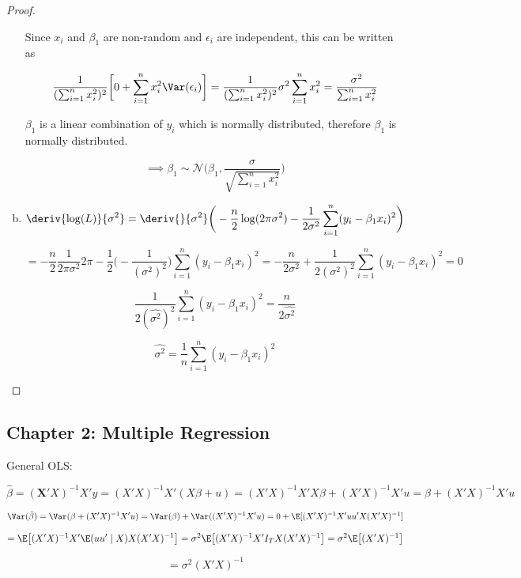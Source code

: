 \begin{proof}
\begin{enumerate}[(a)]
Since \(x_i\) and \(\beta_1\) are non-random and \(\epsilon_i\) are independent, this can be written as

\[
\frac{1}{(\sum_{i=1}^n x_i^2)^2} \bigg[0 + \sum_{i=1}^n x_i^2 \Var(\epsilon_i)  \bigg] =  \frac{1}{(\sum_{i=1}^n x_i^2)^2} \sigma^2 \sum_{i=1}^n x_i^2 = \frac{\sigma^2}{\sum_{i=1}^n x_i^2}
\]

\(\beta_1\) is a linear combination of \(y_i\) which is normally distributed, therefore \(\beta_1\) is normally distributed.

\[
\implies
\beta_1 \sim\mathcal{N}\bigg(\beta_1, \frac{\sigma}{\sqrt{\sum_{i=1}^n x_i^2}}\bigg)
\]

\item

\[
\deriv{\log(L)}{\sigma^2} = \deriv{}{\sigma^2} \bigg(  -\frac{n}{2} \log(2 \pi \sigma^2) -\frac{1}{2\sigma^2} \sum_{i=1}^n (y_i - \beta_1 x_i)^2  \bigg)
\]

\[
= -\frac{n}{2} \frac{1}{2 \pi \sigma^2} 2 \pi - \frac{1}{2} \bigg(- \frac{1}{(\sigma^2)^2} \bigg) \sum_{i=1}^n (y_i - \beta_1 x_i)^2 = -\frac{n}{2\sigma^2} + \frac{1}{2(\sigma^2)^2} \sum_{i=1}^n (y_i - \beta_1 x_i)^2 = 0
\]

\[
\frac{1}{2(\hat{\sigma^2})^2} \sum_{i=1}^n (y_i - \beta_1 x_i)^2  = \frac{n}{2\hat{\sigma^2}}
\]

\[
\hat{\sigma^2} = \frac{1}{n}\sum_{i=1}^n (y_i - \beta_1 x_i)^2 
\]

\end{enumerate}

\end{proof}

\subsection{Chapter 2: Multiple Regression}

General OLS:

\[
\hat{\beta} = (\boldsymbol{X}'X)^{-1}X'y = (X'X)^{-1}X'(X\beta + u) = (X'X)^{-1}X'X\beta + (X'X)^{-1}X'u  = \beta + (X'X)^{-1}X'u
\]

\[
\Var(\hat{\beta}) = \Var(\beta + (X'X)^{-1}X'u) = \Var(\beta) + \Var((X'X)^{-1}X' u) = 0 + \E[(X'X)^{-1}X' uu' X (X'X)^{-1} ] 
\]

\[
=\E \big[ (X'X)^{-1}X' \E(uu' \mid X)X(X'X)^{-1} \big] = \sigma^2 \E \big[ (X'X)^{-1}X' I_T X(X'X)^{-1} \big] = \sigma^2 \E \big[ (X'X)^{-1} \big]
\]

\[
= \sigma^2  (X'X)^{-1} 
\]

